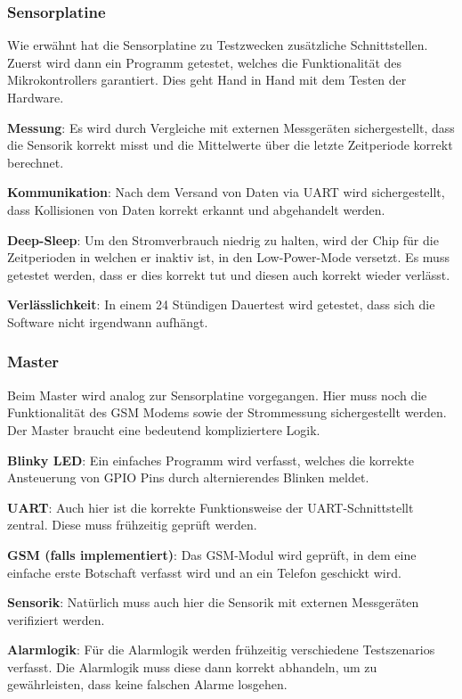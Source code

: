 \subsubsection{Sensorplatine}

Wie   erw\"ahnt   hat   die   Sensorplatine   zu   Testzwecken   zus\"atzliche
Schnittstellen. Zuerst   wird  dann   ein  Programm   getestet,  welches   die
Funktionalit\"at des  Mikrokontrollers garantiert. Dies geht Hand  in Hand mit
dem Testen der Hardware.

\textbf{Messung}: Es   wird  durch   Vergleiche  mit   externen  Messger\"aten
sichergestellt, dass die Sensorik korrekt misst und die Mittelwerte \"uber die
letzte Zeitperiode korrekt berechnet.

\textbf{Kommunikation}: Nach   dem   Versand   von   Daten   via   UART   wird
sichergestellt,  dass Kollisionen  von Daten  korrekt erkannt  und abgehandelt
werden.

\textbf{Deep-Sleep}: Um den  Stromverbrauch niedrig  zu halten, wird  der Chip
f\"ur  die Zeitperioden  in  welchen  er inaktiv  ist,  in den  Low-Power-Mode
versetzt. Es muss  getestet werden, dass er  dies korrekt tut und  diesen auch
korrekt wieder verl\"asst.

\textbf{Verl\"asslichkeit}: In einem  24 St\"undigen Dauertest  wird getestet,
dass sich die Software nicht irgendwann aufh\"angt.

\subsubsection{Master}

Beim Master  wird analog  zur Sensorplatine  vorgegangen. Hier muss  noch die
Funktionalit\"at des GSM Modems  sowie der Strommessung sichergestellt werden.
Der Master braucht eine bedeutend kompliziertere Logik.

\textbf{Blinky  LED}: Ein  einfaches  Programm   wird  verfasst,  welches  die
korrekte Ansteuerung von GPIO Pins durch alternierendes Blinken meldet.

\textbf{UART}: Auch    hier    ist    die    korrekte    Funktionsweise    der
UART-Schnittstellt zentral. Diese muss fr\"uhzeitig gepr\"uft werden.

\textbf{GSM (falls implementiert)}: Das GSM-Modul  wird gepr\"uft, in dem eine
einfache erste Botschaft verfasst wird und an ein Telefon geschickt wird.

\textbf{Sensorik}: Nat\"urlich  muss  auch  hier  die  Sensorik  mit  externen
Messger\"aten verifiziert werden.

\textbf{Alarmlogik}: F\"ur  die  Alarmlogik werden  fr\"uhzeitig  verschiedene
Testszenarios verfasst. Die  Alarmlogik muss diese dann  korrekt abhandeln, um
zu gew\"ahrleisten, dass keine falschen Alarme losgehen.
